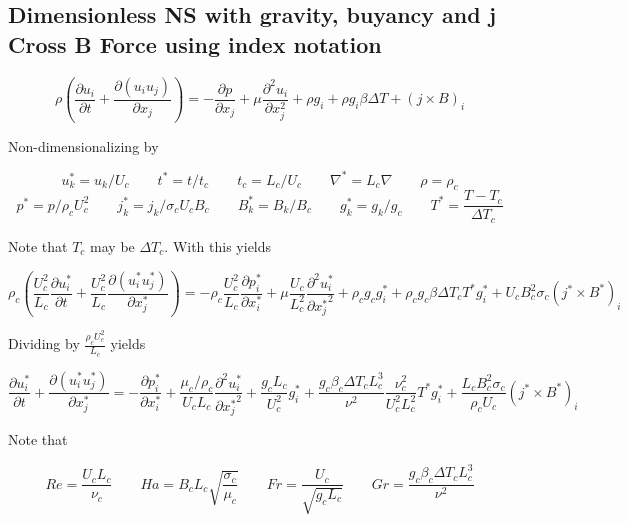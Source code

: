 \documentclass[11pt]{article}
\newcommand{\PD}{\partial}
\begin{document}
\subsection{Dimensionless NS with gravity, buyancy and j Cross B Force using index notation}
\begin{equation}
	\rho
	\left(
	\frac{\PD u_i}{\PD t} +
	\frac{\PD (u_i u_j)}{\PD x_j}
	\right)
	=
	- \frac{\PD p}{\PD x_j}
	+ \mu \frac{\PD^2 u_i}{\PD x_j^2}
	+ \rho g_i
	+ \rho g_i \beta \Delta T
	+ (j \times B)_i
\end{equation}

Non-dimensionalizing by

\begin{equation}
	u_k^* = u_k/U_c \qquad
	t^* = t/t_c \qquad
	t_c = L_c/U_c \qquad
	\nabla^* = L_c \nabla \qquad
	\rho = \rho_c
\end{equation}
\begin{equation}
	p^* = p/\rho_c U_c^2 \qquad
	j_k^* = j_k/ \sigma_c U_c B_c \qquad
	B_k^* = B_k/B_c \qquad
	g_k^* = g_k/g_c \qquad
	T^* = \frac{T - T_c}{\Delta T_c}
\end{equation}

Note that $T_c$ may be $\Delta T_c$. With this yields

\begin{equation}
	\rho_c
	\left(
	\frac{U_c^2}{L_c}
	\frac{\PD u_i^*}{\PD t} +
	\frac{U_c^2}{L_c}
	\frac{\PD (u_i^* u_j^*)}{\PD x_j^*}
	\right)
	=
	- \rho_c \frac{U_c^2}{L_c}
	\frac{\PD p_i^*}{\PD x_i^*}
	+ \mu \frac{U_c}{L_c^2}
	\frac{\PD^2 u_i^*}{\PD {x_j^*}^2}
	+ \rho_c g_c g_i^*
	+ \rho_c g_c \beta \Delta T_c T^*g_i^*
	+ U_c B_c^2 \sigma_c
	(j^* \times B^*)_i
\end{equation}

Dividing by $\frac{\rho_c U_c^2}{L_c}$ yields

\begin{equation}
	\frac{\PD u_i^*}{\PD t} +
	\frac{\PD (u_i^* u_j^*)}{\PD x_j^*}
	=
	- \frac{\PD p_i^*}{\PD x_i^*}
	+ \frac{\mu_c/\rho_c}{U_c L_c}
	\frac{\PD^2 u_i^*}{\PD {x_j^*}^2}
	+ \frac{g_c L_c}{U_c^2}
	g_i^*
	+ \frac{g_c \beta_c \Delta T_c L_c^3}{\nu^2} \frac{\nu_c^2}{U_c^2 L_c^2} T^*g_i^*
	+ \frac{L_c B_c^2 \sigma_c}{\rho_c U_c}
	(j^* \times B^*)_i
\end{equation}

Note that

\begin{equation}
	Re = \frac{U_c L_c}{\nu_c} \qquad
	Ha = B_c L_c \sqrt{\frac{\sigma_c}{\mu_c}} \qquad
	Fr = \frac{U_c}{\sqrt{g_c L_c}} \qquad
	Gr = \frac{g_c \beta_c \Delta T_c L_c^3}{\nu^2}
\end{equation}
\end{document}
